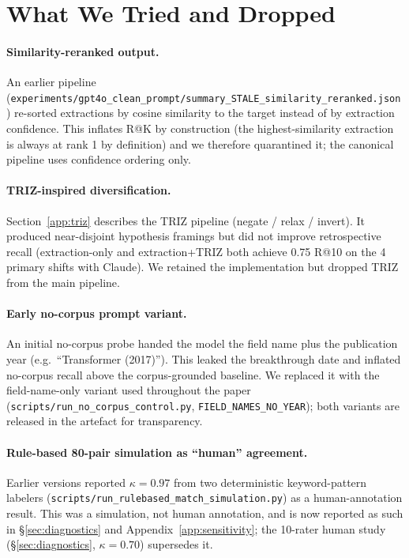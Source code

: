 \documentclass[11pt]{article}
\newcommand{\fpath}[1]{\mbox{}\nolinkurl{#1}}
\begin{document}
\section{What We Tried and Dropped}\label{app:dropped}

\paragraph{Similarity-reranked output.} An earlier pipeline (\fpath{experiments/gpt4o_clean_prompt/summary_STALE_similarity_reranked.json}) re-sorted extractions by cosine similarity to the target instead of by extraction confidence. This inflates R@K by construction (the highest-similarity extraction is always at rank 1 by definition) and we therefore quarantined it; the canonical pipeline uses confidence ordering only.

\paragraph{TRIZ-inspired diversification.} Section~\ref{app:triz} describes the TRIZ pipeline (negate / relax / invert). It produced near-disjoint hypothesis framings but did not improve retrospective recall (extraction-only and extraction+TRIZ both achieve 0.75 R@10 on the 4 primary shifts with Claude). We retained the implementation but dropped TRIZ from the main pipeline.

\paragraph{Early no-corpus prompt variant.} An initial no-corpus probe handed the model the field name plus the publication year (e.g.\ ``Transformer (2017)''). This leaked the breakthrough date and inflated no-corpus recall above the corpus-grounded baseline. We replaced it with the field-name-only variant used throughout the paper (\fpath{scripts/run_no_corpus_control.py}, \texttt{FIELD\_NAMES\_NO\_YEAR}); both variants are released in the artefact for transparency.

\paragraph{Rule-based 80-pair simulation as ``human'' agreement.} Earlier versions reported $\kappa = 0.97$ from two deterministic keyword-pattern labelers (\fpath{scripts/run_rulebased_match_simulation.py}) as a human-annotation result. This was a simulation, not human annotation, and is now reported as such in \S\ref{sec:diagnostics} and Appendix~\ref{app:sensitivity}; the 10-rater human study (\S\ref{sec:diagnostics}, $\kappa = 0.70$) supersedes it.
\end{document}

